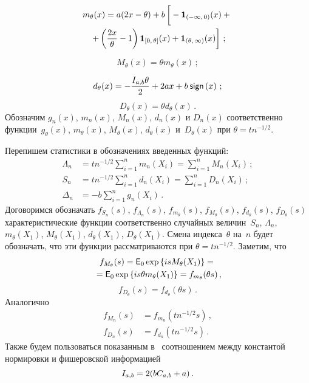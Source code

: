 \begin{multicols}{2}
\noindent
\begin{multline}
m_{\theta}(x) = a(2x - \theta) + b
\left[ \vphantom{\fr{2x}{\theta}}
-{\III}_{(-\infty,\,0)}(x) +{}\right.\\
{}\left.+ \left(\fr{2x}{\theta} - 1\right){\III}_{[0,\,\theta]}(x) + 
{\III}_{(\theta,\,\infty)}(x)\right]\,;
\label{l9}
\end{multline}

\vspace*{-6pt}

\noindent
\begin{equation}
M_{\theta}(x) = \theta m_{\theta}(x)\,;
\label{l10}
\end{equation}

\vspace*{-6pt}

\noindent
\begin{equation*}
d_{\theta}(x) = -\displaystyle\frac{\displaystyle I_{a,b} \theta\mathstrut}{\displaystyle 2\mathstrut} + 2ax+b\:{\sf sign}\left(x\right)\,;
\end{equation*}
\begin{equation*}
D_{\theta}(x) = \theta d_{\theta}(x)\,.
\end{equation*}
Обозначим $g_n(x)$, $m_n(x)$, $M_n(x)$, $d_n(x)$ и $D_n(x)$ соответственно функции~$g_{\theta}(x)$, 
$m_{\theta}(x)$,  $M_{\theta}(x)$, $d_{\theta}(x)$ и~$D_{\theta}(x)$ при $\theta=tn^{-1/2}$.

Перепишем статистики в обозначениях введенных функций:
\begin{align}
\Lambda_n &= tn^{-1/2} \sum\limits_{i=1}^n m_n(X_i) = \sum\limits_{i=1}^n M_n(X_i)\,; \label{l13}\\
S_n &= tn^{-1/2} \sum\limits_{i=1}^n d_n(X_i) = \sum\limits_{i=1}^n D_n(X_i)\,; \label{l14}\\
\Delta_n &= -b\sum\limits_{i=1}^n g_n(X_i)\,. \label{l15}
\end{align}
Договоримся обозначать $f_{S_n}(s)$, $f_{\Lambda_n}(s)$, $f_{m_{\theta}}(s)$, 
$f_{M_{\theta}}(s)$, $f_{d_{\theta}}(s)$, $f_{D_{\theta}}(s)$ характеристические
 функции соответственно случайных величин~$S_n$, 
$\Lambda_n$, $m_{\theta}(X_1)$, $M_{\theta}(X_1)$, $d_{\theta}(X_1)$, $D_{\theta}(X_1)$. 
Смена индекса~$\theta$ на~$n$ будет обозначать, что эти функции рассматриваются при $\theta=tn^{-1/2}$. Заметим, что
\begin{multline*}
f_{M_{\theta}}(s) = {{\sf E}}_0 \exp\left\{isM_{\theta}(X_1)\right\} ={}\\
{}= {{\sf E}}_0 \exp\left\{is\theta m_{\theta}(X_1)\right\} = f_{m_{\theta}}(\theta s)\,,
\end{multline*}
$$
f_{D_{\theta}}(s) = f_{d_{\theta}}(\theta s)\,.
$$
Аналогично
\begin{align}
f_{M_n}(s) & = f_{m_n}(tn^{-1/2}s)\,, \label{l16}\\
f_{D_n}(s)&= f_{d_n}(tn^{-1/2}s)\,. \label{l17}
\end{align}
Также будем пользоваться показанным в~\cite{article} соотношением между константой нормировки и фишеровской информацией
$$
I_{a,b} = 2(bC_{a,b}+a)\,.
$$


\end{multicols}
